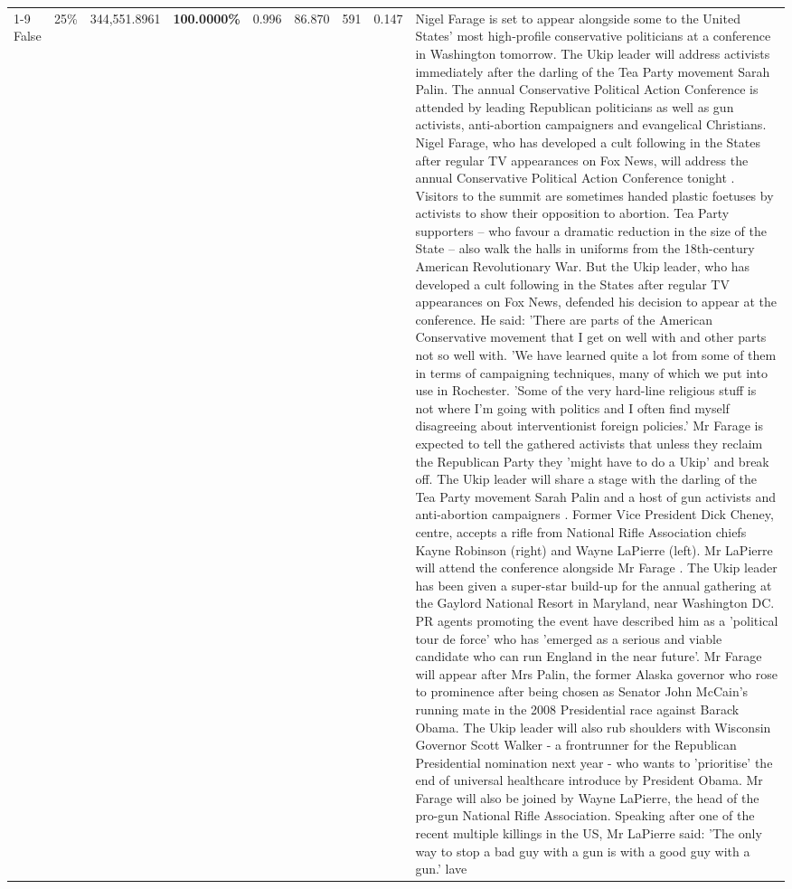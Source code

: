 \begin{table}[H]
\begin{tabular}{lllrlllll}
\cline{1-9} \cline{2-9}
False & 25\% & 344,551.8961 & \bfseries \color{red} 100.0000\% & 0.996 & 86.870 & 591 & 0.147 & Nigel Farage is set to appear alongside some to the United States' most high-profile conservative politicians at a conference in Washington tomorrow. The Ukip leader will address activists immediately after the darling of the Tea Party movement Sarah Palin. The annual Conservative Political Action Conference is attended by leading Republican politicians as well as gun activists, anti-abortion campaigners and evangelical Christians. Nigel Farage, who has developed a cult following in the States after regular TV appearances on Fox News, will address the annual Conservative Political Action Conference tonight . Visitors to the summit are sometimes handed plastic foetuses by activists to show their opposition to abortion. Tea Party supporters – who favour a dramatic reduction in the size of the State – also walk the halls in uniforms from the 18th-century American Revolutionary War. But the Ukip leader, who has developed a cult following in the States after regular TV appearances on Fox News, defended his decision to appear at the conference. He said: 'There are parts of the American Conservative movement that I get on well with and other parts not so well with. 'We have learned quite a lot from some of them in terms of campaigning techniques, many of which we put into use in Rochester. 'Some of the very hard-line religious stuff is not where I'm going with politics and I often find myself disagreeing about interventionist foreign policies.' Mr Farage is expected to tell the gathered activists that unless they reclaim the Republican Party they 'might have to do a Ukip' and break off. The Ukip leader will share a stage with the darling of the Tea Party movement Sarah Palin and a host of gun activists and anti-abortion campaigners . Former Vice President Dick Cheney, centre, accepts a rifle from National Rifle Association chiefs Kayne Robinson (right) and Wayne LaPierre (left). Mr LaPierre will attend the conference alongside Mr Farage . The Ukip leader has been given a super-star build-up for the annual gathering at the Gaylord National Resort in Maryland, near Washington DC. PR agents promoting the event have described him as a 'political tour de force' who has 'emerged as a serious and viable candidate who can run England in the near future'. Mr Farage will appear after Mrs Palin, the former Alaska governor who rose to prominence after being chosen as Senator John McCain's running mate in the 2008 Presidential race against Barack Obama. The Ukip leader will also rub shoulders with Wisconsin Governor Scott Walker - a frontrunner for the Republican Presidential nomination next year - who wants to 'prioritise' the end of universal healthcare introduce by President Obama. Mr Farage will also be joined by Wayne LaPierre, the head of the pro-gun National Rifle Association. Speaking after one of the recent multiple killings in the US, Mr LaPierre said: 'The only way to stop a bad guy with a gun is with a good guy with a gun.' lave \\

\end{tabular}
\end{table}
